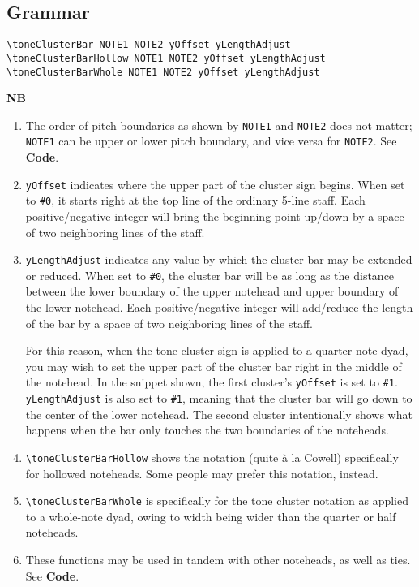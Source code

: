 \subsection{Grammar}
\begin{verbatim}
\toneClusterBar NOTE1 NOTE2 yOffset yLengthAdjust
\toneClusterBarHollow NOTE1 NOTE2 yOffset yLengthAdjust
\toneClusterBarWhole NOTE1 NOTE2 yOffset yLengthAdjust
\end{verbatim}
\textbf{NB} \begin{enumerate}
\item The order of pitch boundaries as shown by \verb|NOTE1| and \verb|NOTE2| does not matter; \verb|NOTE1| can be upper or lower pitch boundary, and vice versa for \verb|NOTE2|. See \textbf{Code}. 
\item \verb|yOffset| indicates where the upper part of the cluster sign begins. When set to \verb|#0|, it starts right at the top line of the ordinary 5-line staff. Each positive/negative integer will bring the beginning point up/down by a space of two neighboring lines of the staff.
\item \verb|yLengthAdjust| indicates any value by which the cluster bar may be extended or reduced. When set to \verb|#0|, the cluster bar will be as long as the distance between the lower boundary of the upper notehead and upper boundary of the lower notehead. Each positive/negative integer will add/reduce the length of the bar by a space of two neighboring lines of the staff.

For this reason, when the tone cluster sign is applied to a quarter-note dyad, you may wish to set the upper part of the cluster bar right in the middle of the notehead. In the snippet shown, the first cluster's \verb|yOffset| is set to \verb|#1|.  \verb|yLengthAdjust| is also set to \verb|#1|, meaning that the cluster bar will go down to the center of the lower notehead. The second cluster intentionally shows what happens when the bar only touches the two boundaries of the noteheads.

\item \verb|\toneClusterBarHollow| shows the notation (quite à la Cowell) specifically for hollowed noteheads. Some people may prefer this notation, instead.
\item \verb|\toneClusterBarWhole| is specifically for the tone cluster notation as applied to a whole-note dyad, owing to width being wider than the quarter or half noteheads. 

\item These functions may be used in tandem with other noteheads, as well as ties. See \textbf{Code}. 

\end{enumerate}
